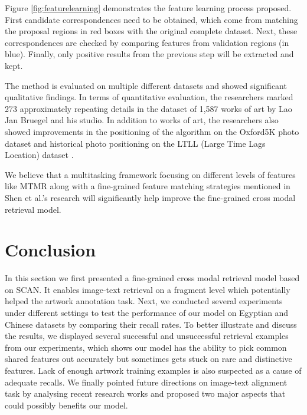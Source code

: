 Figure \ref{fig:featurelearning} demonstrates the feature learning process proposed. First candidate correspondences need to be obtained, which come from matching the proposal regions in red boxes with the original complete dataset. Next, these correspondences are checked by comparing features from validation regions (in blue). Finally, only positive results from the previous step will be extracted and kept. 

The method is evaluated on multiple different datasets and showed significant qualitative findings. In terms of quantitative evaluation, the researchers marked 273 approximately repeating details in the dataset of 1,587 works of art by Lao Jan Bruegel and his studio. In addition to works of art, the researchers also showed improvements in the positioning of the algorithm on the Oxford5K photo dataset \cite{Philbin07} and historical photo positioning on the LTLL (Large Time Lags Location) dataset \cite{Fernando2015CVIU}.

We believe that a multitasking framework focusing on different levels of features like MTMR \cite{parttowhole} along with a fine-grained feature matching strategies mentioned in Shen et al.'s research \cite{shen2019discovering} will significantly help improve the fine-grained cross modal retrieval model.

\section{Conclusion}
In this section we first presented a fine-grained cross modal retrieval model based on SCAN. It enables image-text retrieval on a fragment level which potentially helped the artwork annotation task. Next, we conducted several experiments under different settings to test the performance of our model on Egyptian and Chinese datasets by comparing their recall rates. To better illustrate and discuss the results, we displayed several successful and unsuccessful retrieval examples from our experiments, which shows our model has the ability to pick common shared features out accurately but sometimes gets stuck on rare and distinctive features. Lack of enough artwork training examples is also suspected as a cause of adequate recalls. We finally pointed future directions on image-text alignment task by analysing recent research works and proposed two major aspects that could possibly benefits our model.

